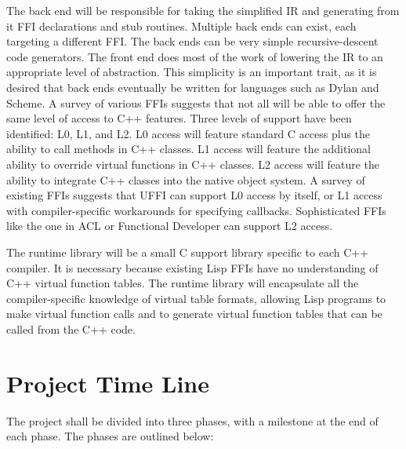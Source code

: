 \documentclass[12pt]{article}
\begin{document}
The back end will be responsible for taking the simplified IR and
generating from it FFI declarations and stub routines. Multiple back
ends can exist, each targeting a different FFI. The back ends can be
very simple recursive-descent code generators. The front end does most
of the work of lowering the IR to an appropriate level of abstraction.
This simplicity is an important trait, as it is desired that back ends
eventually be written for languages such as Dylan and Scheme. A survey
of various FFIs suggests that not all will be able to offer the same
level of access to C++ features. Three levels of support have been
identified: L0, L1, and L2. L0 access will feature standard C access
plus the ability to call methods in C++ classes. L1 access will
feature the additional ability to override virtual functions in C++
classes. L2 access will feature the ability to integrate C++ classes
into the native object system. A survey of existing FFIs suggests that
UFFI can support L0 access by itself, or L1 access with compiler-specific workarounds for
specifying callbacks. Sophisticated FFIs like the one in ACL or
Functional Developer can support L2 access.

The runtime library will be a small C support library specific to each
C++ compiler. It is necessary because existing Lisp FFIs have no
understanding of C++ virtual function tables. The runtime library will
encapsulate all the compiler-specific knowledge of virtual table
formats, allowing Lisp programs to make virtual function calls and to
generate virtual function tables that can be called from the C++ code.
    
\section{Project Time Line}

The project shall be divided into three phases, with a milestone at
the end of each phase. The phases are outlined below:
\end{document}
